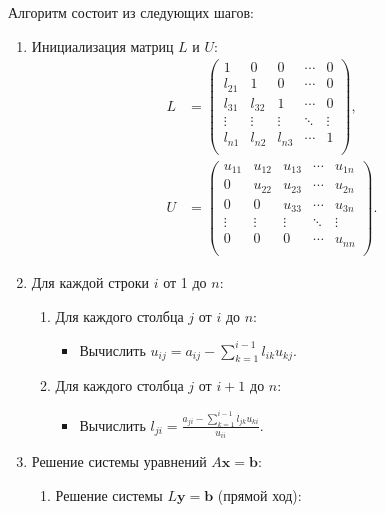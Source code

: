 \documentclass{article}
\begin{document}
Алгоритм состоит из следующих шагов:
\begin{enumerate}
    \item Инициализация матриц \(L\) и \(U\):
    \begin{align*}
        L &= \begin{pmatrix}
        1 & 0 & 0 & \cdots & 0 \\
        l_{21} & 1 & 0 & \cdots & 0 \\
        l_{31} & l_{32} & 1 & \cdots & 0 \\
        \vdots & \vdots & \vdots & \ddots & \vdots \\
        l_{n1} & l_{n2} & l_{n3} & \cdots & 1 \\
        \end{pmatrix}, \\
        U &= \begin{pmatrix}
        u_{11} & u_{12} & u_{13} & \cdots & u_{1n} \\
        0 & u_{22} & u_{23} & \cdots & u_{2n} \\
        0 & 0 & u_{33} & \cdots & u_{3n} \\
        \vdots & \vdots & \vdots & \ddots & \vdots \\
        0 & 0 & 0 & \cdots & u_{nn} \\
        \end{pmatrix}.
    \end{align*}
    \item Для каждой строки \(i\) от 1 до \(n\):
    \begin{enumerate}
        \item Для каждого столбца \(j\) от \(i\) до \(n\):
        \begin{itemize}
            \item Вычислить \(u_{ij} = a_{ij} - \sum_{k=1}^{i-1} l_{ik} u_{kj}\).
        \end{itemize}
        \item Для каждого столбца \(j\) от \(i+1\) до \(n\):
        \begin{itemize}
            \item Вычислить \(l_{ji} = \frac{a_{ji} - \sum_{k=1}^{i-1} l_{jk} u_{ki}}{u_{ii}}\).
        \end{itemize}
    \end{enumerate}
    \item Решение системы уравнений \(A\mathbf{x} = \mathbf{b}\):
    \begin{enumerate}
        \item Решение системы \(L\mathbf{y} = \mathbf{b}\) (прямой ход):

\end{enumerate}
\end{enumerate}
\end{document}
